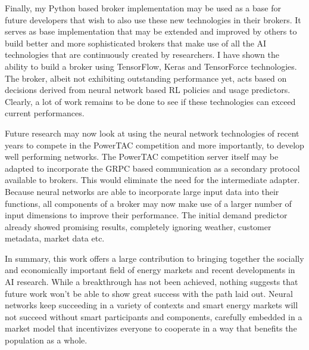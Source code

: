 Finally, my Python based broker implementation may be used as a base for future developers that wish to also use these
new technologies in their brokers. It serves as base implementation that may be extended and improved by others to build
better and more sophisticated brokers that make use of all the \ac{AI} technologies that are continuously created by
researchers. I have shown the ability to build a broker using TensorFlow, Keras and TensorForce technologies. The
broker, albeit not exhibiting outstanding performance yet, acts based on decisions derived from neural network based \ac{RL}
policies and usage predictors. Clearly, a lot of work remains to be done to see if these technologies can exceed current
performances.


Future research may now look at using the neural network technologies of recent years to compete in the \ac{PowerTAC}
competition and more importantly, to develop well performing networks. The \ac{PowerTAC} competition server itself may be adapted to incorporate the \ac{GRPC} based communication
as a secondary protocol available to brokers. This would eliminate the need for the intermediate adapter. Because
neural networks are able to incorporate large input data into their functions, all components of a broker may now make use of a
larger number of input dimensions to improve their performance. The initial demand predictor already showed promising
results, completely ignoring weather, customer metadata, market data etc.

In summary, this work offers a large contribution to bringing together the socially and economically important field of
energy markets and recent developments in \ac{AI} research. While a breakthrough has not been achieved, nothing suggests
that future work won't be able to show great success with the path laid out. Neural networks keep succeeding in a variety of
contexts and smart energy markets will not succeed without smart participants and components, carefully embedded in a
market model that incentivizes everyone to cooperate in a way that benefits the population as a whole.
